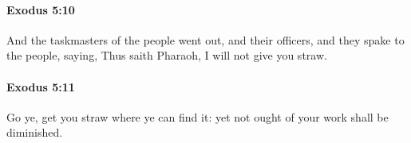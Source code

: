 		\paragraph{Exodus 5:10} %
			\label{EXODUS-5-10}

			And the taskmasters of the people went out, and their officers, and they spake to the people, saying, Thus saith Pharaoh, I will not give you straw.


		\paragraph{Exodus 5:11} %
			\label{EXODUS-5-11}

			Go ye, get you straw where ye can find it: yet not ought of your work shall be diminished.


